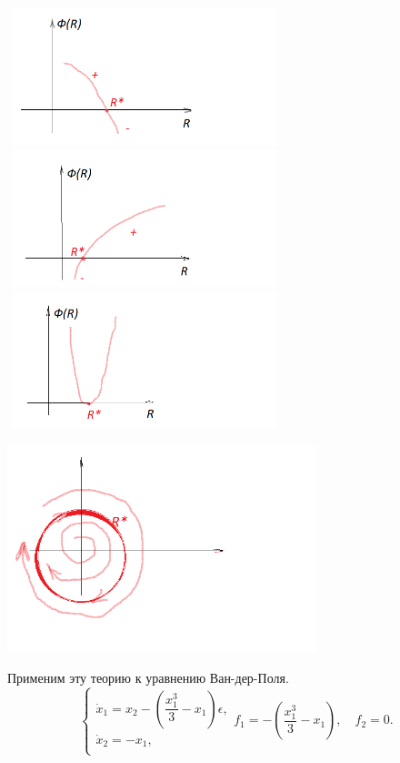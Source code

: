  	\begin{center}
 		\includegraphics[width=8cm, height=4cm]{ch10/2}
 		\includegraphics[width=8cm, height=4cm]{ch10/3}
 		\includegraphics[width=8cm, height=4cm]{ch10/4}
 	\end{center}
 	\begin{center}
 		\includegraphics[width=9cm, height=6cm]{ch10/5}
 	\end{center}
 	Применим эту теорию к уравнению Ван-дер-Поля.\\
 	\[
 	\begin{cases}
 	\dot x_1 = x_2 - \left( \dfrac{x_1^3}{3} - x_1\right) \epsilon, \\
 	\dot x_2 = -x_1,\\
 	\end{cases}
 	f_1 = -\left( \dfrac{x_1^3}{3} - x_1\right), \quad f_2 = 0.
 	\]
